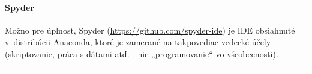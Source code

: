 \documentclass[a4paper, 10pt, ]{article}
\begin{document}
\paragraph{Spyder}
Možno pre úplnosť, Spyder (\url{https://github.com/spyder-ide}) je IDE obsiahnuté v~distribúcii Anaconda, ktoré je zamerané na takpovediac vedecké účely (skriptovanie, práca s dátami atď. - nie „programovanie“ vo všeobecnosti).

\medskip

\noindent
\hrule








% 


% 

\end{document}
